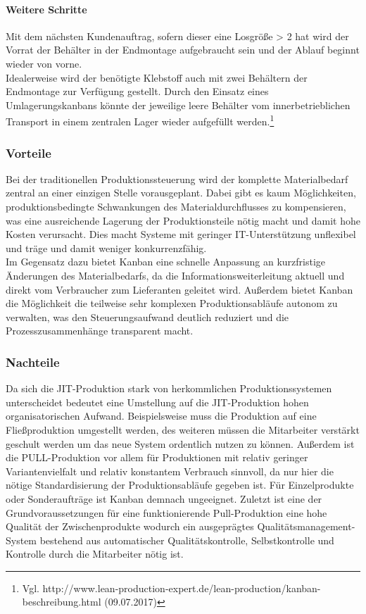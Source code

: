 \documentclass[00_ToyotaProduktionssystem.tex]{subfiles}
\begin{document}
\paragraph{Weitere Schritte}
Mit dem nächsten Kundenauftrag, sofern dieser eine Losgröße > 2 hat wird der Vorrat der Behälter in der Endmontage aufgebraucht sein und der Ablauf beginnt wieder von vorne.\\
Idealerweise wird der benötigte Klebstoff auch mit zwei Behältern der Endmontage zur Verfügung gestellt. Durch den Einsatz eines Umlagerungskanbans könnte der jeweilige leere Behälter vom innerbetrieblichen Transport in einem zentralen Lager wieder aufgefüllt werden.\footnote{Vgl. http://www.lean-production-expert.de/lean-production/kanban-beschreibung.html (09.07.2017)}

\subsubsection{Vorteile}
Bei der traditionellen Produktionssteuerung wird der komplette Materialbedarf zentral an einer einzigen Stelle vorausgeplant. Dabei gibt es kaum Möglichkeiten, produktionsbedingte Schwankungen des Materialdurchflusses zu kompensieren, was eine ausreichende Lagerung der Produktionsteile nötig macht und damit hohe Kosten verursacht. Dies macht Systeme mit geringer IT-Unterstützung unflexibel und träge und damit weniger konkurrenzfähig.\\
Im Gegensatz dazu bietet Kanban eine schnelle Anpassung an kurzfristige Änderungen des Materialbedarfs, da die Informationsweiterleitung aktuell und direkt vom Verbraucher zum Lieferanten geleitet wird. Außerdem bietet Kanban die Möglichkeit die teilweise sehr komplexen Produktionsabläufe autonom zu verwalten, was den Steuerungsaufwand deutlich reduziert und die Prozesszusammenhänge transparent macht.
\subsubsection{Nachteile}
Da sich die JIT-Produktion stark von herkommlichen Produktionssystemen unterscheidet bedeutet eine Umstellung auf die JIT-Produktion hohen organisatorischen Aufwand. Beispielsweise muss die Produktion auf eine Fließproduktion umgestellt werden, des weiteren müssen die Mitarbeiter verstärkt geschult werden um das neue System ordentlich nutzen zu können. Außerdem ist die PULL-Produktion vor allem für Produktionen mit relativ geringer Variantenvielfalt und relativ konstantem Verbrauch sinnvoll, da nur hier die nötige Standardisierung der Produktionsabläufe gegeben ist. Für Einzelprodukte oder Sonderaufträge ist Kanban demnach ungeeignet. Zuletzt ist eine der Grundvoraussetzungen für eine funktionierende Pull-Produktion eine hohe Qualität der Zwischenprodukte wodurch ein ausgeprägtes Qualitätsmanagement-System bestehend aus automatischer Qualitätskontrolle, Selbstkontrolle und Kontrolle durch die Mitarbeiter nötig ist.
\end{document}
